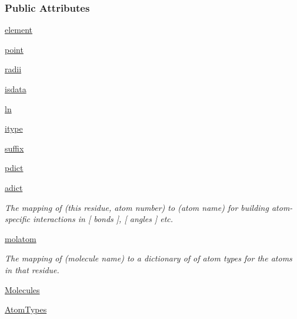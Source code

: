 \subsubsection*{Public Attributes}
\begin{DoxyCompactItemize}
\item 
\hyperlink{classforcebalance_1_1psi4io_1_1Grid__Reader_aef1fb2c7e576834299a1f926f83061b5}{element}
\item 
\hyperlink{classforcebalance_1_1psi4io_1_1Grid__Reader_a556a1786a7db1a738a680a784696bf2e}{point}
\item 
\hyperlink{classforcebalance_1_1psi4io_1_1Grid__Reader_a82c8a907130461776b26605ee022f951}{radii}
\item 
\hyperlink{classforcebalance_1_1psi4io_1_1Grid__Reader_a1134ad300de317ee30aa333d24978cc0}{isdata}
\item 
\hyperlink{classforcebalance_1_1BaseReader_a80c8e3bea212600742968aa8669e557b}{ln}
\item 
\hyperlink{classforcebalance_1_1BaseReader_a22ff3f4c684c728e019d801fface36f6}{itype}
\item 
\hyperlink{classforcebalance_1_1BaseReader_a48ef0584a1b6b4b6f8eb741ad8465db8}{suffix}
\item 
\hyperlink{classforcebalance_1_1BaseReader_aaf18c900d6055ed4b5124f6bb26164c1}{pdict}
\item 
\hyperlink{classforcebalance_1_1BaseReader_a2c46ad6b66cf09a30e917ce4a1997e2a}{adict}
\begin{DoxyCompactList}\small\item\em The mapping of (this residue, atom number) to (atom name) for building atom-\/specific interactions in \mbox{[} bonds \mbox{]}, \mbox{[} angles \mbox{]} etc. \end{DoxyCompactList}\item 
\hyperlink{classforcebalance_1_1BaseReader_ab444c213e15929253dd73395ac5f19fc}{molatom}
\begin{DoxyCompactList}\small\item\em The mapping of (molecule name) to a dictionary of of atom types for the atoms in that residue. \end{DoxyCompactList}\item 
\hyperlink{classforcebalance_1_1BaseReader_a4369b5fb663a83b11602daa71db6862e}{Molecules}
\item 
\hyperlink{classforcebalance_1_1BaseReader_a69ca7d949a4a3df4d9f61e617fe0e270}{Atom\-Types}
\end{DoxyCompactItemize}


